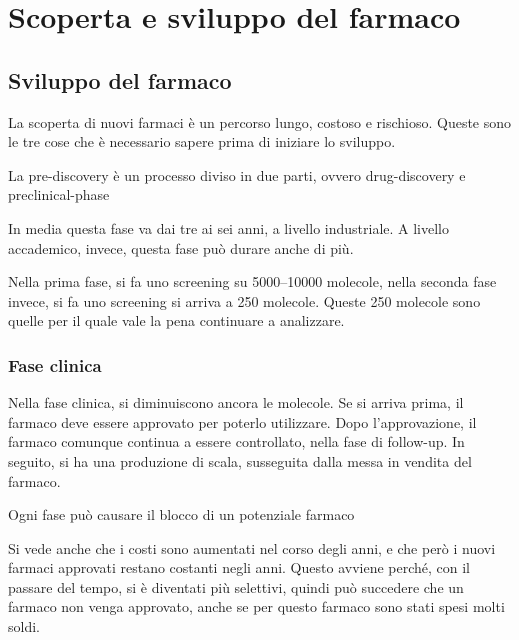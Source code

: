 \part{Scoperta e sviluppo del farmaco}

\chapter{Sviluppo del farmaco}

La scoperta di nuovi farmaci è un
percorso lungo, costoso e rischioso. Queste sono le tre cose che
è necessario sapere prima di iniziare lo sviluppo.

La pre-discovery è un processo diviso in due parti, ovvero drug-discovery e preclinical-phase

In media questa fase va dai tre ai sei anni, a livello industriale. A
livello accademico, invece, questa fase può durare anche di più.

Nella prima fase, si fa uno screening su 5000--10000 molecole, nella
seconda fase invece, si fa uno screening si arriva a 250 molecole.
Queste 250 molecole sono quelle per il quale vale la pena continuare a
analizzare.


\section{Fase clinica}

Nella fase clinica, si diminuiscono ancora le molecole. Se si arriva prima, il farmaco deve
essere approvato per poterlo utilizzare. Dopo l'approvazione, il farmaco
comunque continua a essere controllato, nella fase di follow-up.
In seguito, si ha una produzione di scala, susseguita dalla messa in
vendita del farmaco.

Ogni fase può causare il blocco di un potenziale farmaco


Si vede anche che i costi sono aumentati nel corso degli anni, e che
però i nuovi farmaci approvati restano costanti negli anni. Questo
avviene perché, con il passare del tempo, si è diventati più selettivi,
quindi può succedere che un farmaco non venga approvato, anche se per
questo farmaco sono stati spesi molti soldi.

